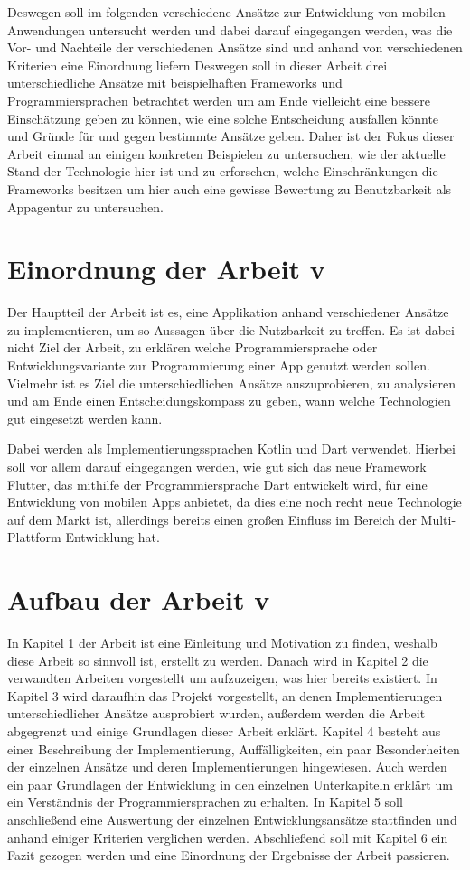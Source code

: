 Deswegen soll im folgenden verschiedene Ansätze zur Entwicklung von mobilen Anwendungen untersucht werden und dabei darauf eingegangen werden, was die Vor- und Nachteile der verschiedenen Ansätze sind und anhand von verschiedenen Kriterien eine Einordnung liefern
Deswegen soll in dieser Arbeit drei unterschiedliche Ansätze mit beispielhaften Frameworks und Programmiersprachen betrachtet werden um am Ende vielleicht eine bessere Einschätzung geben zu können, wie eine solche Entscheidung ausfallen könnte und Gründe für und gegen bestimmte Ansätze geben.
Daher ist der Fokus dieser Arbeit einmal an einigen konkreten Beispielen zu untersuchen, wie der aktuelle Stand der Technologie hier ist und zu erforschen, welche Einschränkungen die Frameworks besitzen um hier auch eine gewisse Bewertung zu Benutzbarkeit als Appagentur zu untersuchen.


\section{Einordnung der Arbeit v}
Der Hauptteil der Arbeit ist es, eine Applikation anhand verschiedener Ansätze zu implementieren, um so Aussagen über die Nutzbarkeit zu treffen. Es ist dabei nicht Ziel der Arbeit, zu erklären welche Programmiersprache oder Entwicklungsvariante zur Programmierung einer App genutzt werden sollen. Vielmehr ist es Ziel die unterschiedlichen Ansätze auszuprobieren, zu analysieren und am Ende einen Entscheidungskompass zu geben, wann welche Technologien gut eingesetzt werden kann. 

Dabei werden als Implementierungssprachen Kotlin und Dart verwendet. Hierbei soll vor allem darauf eingegangen werden, wie gut sich das neue Framework Flutter, das mithilfe der Programmiersprache Dart entwickelt wird, für eine Entwicklung von mobilen Apps anbietet, da dies eine noch recht neue Technologie auf dem Markt ist, allerdings bereits einen großen Einfluss im Bereich der Multi-Plattform Entwicklung hat.

\section{Aufbau der Arbeit v}
In Kapitel 1 der Arbeit ist eine Einleitung und Motivation zu finden, weshalb diese Arbeit so sinnvoll ist, erstellt zu werden. Danach wird in Kapitel 2 die verwandten Arbeiten vorgestellt um aufzuzeigen, was hier bereits existiert. In Kapitel 3 wird daraufhin das Projekt vorgestellt, an denen Implementierungen unterschiedlicher Ansätze ausprobiert wurden, außerdem werden die Arbeit abgegrenzt und einige Grundlagen dieser Arbeit erklärt.
Kapitel 4 besteht aus einer Beschreibung der Implementierung, Auffälligkeiten, ein paar Besonderheiten der einzelnen Ansätze und deren Implementierungen hingewiesen. Auch werden ein paar Grundlagen der Entwicklung in den einzelnen Unterkapiteln erklärt um ein Verständnis der Programmiersprachen zu erhalten.
In Kapitel 5 soll anschließend eine Auswertung der einzelnen Entwicklungsansätze stattfinden und anhand einiger Kriterien verglichen werden. Abschließend soll mit Kapitel 6 ein Fazit gezogen werden und eine Einordnung der Ergebnisse der Arbeit passieren.